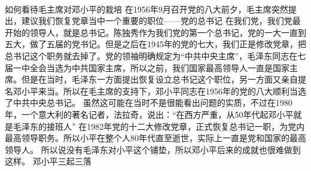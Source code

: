 \documentclass{thuemp}
\begin{document}



\twocolumn[
\begin{@twocolumnfalse}
\maketitle


\end{@twocolumnfalse}
]
\wuhao 

\paragraph*{}如何看待毛主席对邓小平的栽培
在1956年9月召开党的八大前夕，毛主席突然提出，建议我们恢复党章当中一个重要的职位——党的总书记
在我们党，我们党最开始的领导人，就是总书记。陈独秀作为我们党的第一个总书记，党的一大一直到五大，做了五届的党书记。但是之后在1945年的党的七大，我们正是修改党章，把总书记这个职务就去掉了。党的领袖明确规定为“中共中央主席”，毛泽东同志在七届一中全会当选为中共国家主席，所以之前，我们国家最高领导人一直是国家主席。但是在当时，毛泽东一方面提出恢复设立总书记这个职位，另一方面又亲自提名邓小平来当。所以在毛主席的支持下，邓小平同志在1956年的党的八大顺利当选了中共中央总书记。
虽然这可能在当时不是很能看出问题的实质，不过在1980年，一个意大利的著名记者，法拉奇，说出：“在西方严重，从50年代起邓小平就是毛泽东的接班人”
在1982年党的十二大修改党章，正式恢复总书记一职，为党内最高领导职务。所以小平在整个人80年代直至逝世，实际上一直是党和国家的最高领导人。
所以说没有毛泽东对小平这个铺垫，所以邓小平后来的成就也很难做到这样。
邓小平三起三落
\end{document}
